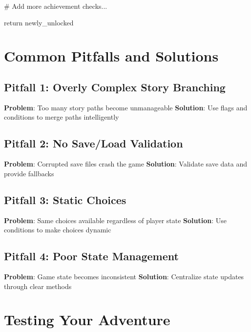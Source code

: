 \documentclass[
  letterpaper,
  DIV=11,
  numbers=noendperiod,
  oneside]{scrreprt}
\newenvironment{Shaded}{}{}
\newcommand{\CommentTok}[1]{\textcolor[rgb]{0.42,0.45,0.49}{#1}}
\newcommand{\ControlFlowTok}[1]{\textcolor[rgb]{0.84,0.23,0.29}{#1}}
\newcommand{\NormalTok}[1]{\textcolor[rgb]{0.14,0.16,0.18}{#1}}
\begin{document}
\begin{Shaded}
\begin{Highlighting}[]
        \CommentTok{\# Add more achievement checks...}
        
        \ControlFlowTok{return}\NormalTok{ newly\_unlocked}
\end{Highlighting}
\end{Shaded}

\section{Common Pitfalls and
Solutions}\label{common-pitfalls-and-solutions-4}

\subsection{Pitfall 1: Overly Complex Story
Branching}\label{pitfall-1-overly-complex-story-branching}

\textbf{Problem}: Too many story paths become unmanageable
\textbf{Solution}: Use flags and conditions to merge paths intelligently

\subsection{Pitfall 2: No Save/Load
Validation}\label{pitfall-2-no-saveload-validation}

\textbf{Problem}: Corrupted save files crash the game \textbf{Solution}:
Validate save data and provide fallbacks

\subsection{Pitfall 3: Static Choices}\label{pitfall-3-static-choices}

\textbf{Problem}: Same choices available regardless of player state
\textbf{Solution}: Use conditions to make choices dynamic

\subsection{Pitfall 4: Poor State
Management}\label{pitfall-4-poor-state-management}

\textbf{Problem}: Game state becomes inconsistent \textbf{Solution}:
Centralize state updates through clear methods

\section{Testing Your Adventure}\label{testing-your-adventure}
\end{document}
